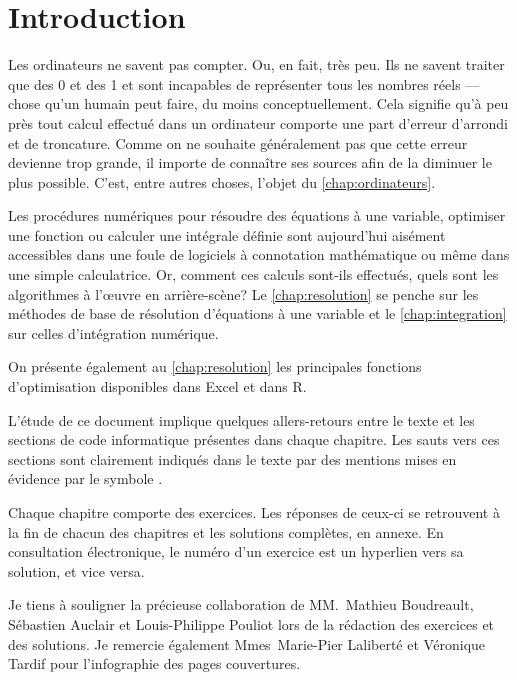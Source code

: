\chapter*{Introduction}

Les ordinateurs ne savent pas compter. Ou, en fait, très peu. Ils ne
savent traiter que des 0 et des 1 et sont incapables de
représenter tous les nombres réels --- chose qu'un humain peut faire,
du moins conceptuellement. Cela signifie qu'à peu près tout calcul
effectué dans un ordinateur comporte une part d'erreur d'arrondi et de
troncature. Comme on ne souhaite généralement pas que cette erreur
devienne trop grande, il importe de connaître ses sources afin de la
diminuer le plus possible. C'est, entre autres choses, l'objet du
\autoref{chap:ordinateurs}.

Les procédures numériques pour résoudre des équations à une variable,
optimiser une fonction ou calculer une intégrale définie sont
aujourd'hui aisément accessibles dans une foule de logiciels à
connotation mathématique ou même dans une simple calculatrice. Or,
comment ces calculs sont-ils effectués, quels sont les algorithmes à
l'{\oe}uvre en arrière-scène? Le \autoref{chap:resolution} se
penche sur les méthodes de base de résolution d'équations à une
variable et le \autoref{chap:integration} sur celles
d'intégration numérique.

On présente également au \autoref{chap:resolution} les
principales fonctions d'optimisation disponibles dans Excel et dans R.

L'étude de ce document implique quelques allers-retours entre le texte
et les sections de code informatique présentes dans chaque chapitre.
Les sauts vers ces sections sont clairement indiqués dans le texte par
des mentions mises en évidence par le symbole {\ForwardToEnd}.

Chaque chapitre comporte des exercices. Les réponses de ceux-ci se
retrouvent à la fin de chacun des chapitres et les solutions
complètes, en annexe. En consultation électronique, le numéro d'un
exercice est un hyperlien vers sa solution, et vice versa.

Je tiens à souligner la précieuse collaboration de MM.~Mathieu
Boudreault, Sébastien Auclair et Louis-Philippe Pouliot lors de la
rédaction des exercices et des solutions. Je remercie également
Mmes~Marie-Pier Laliberté et Véronique Tardif pour l'infographie des
pages couvertures.

